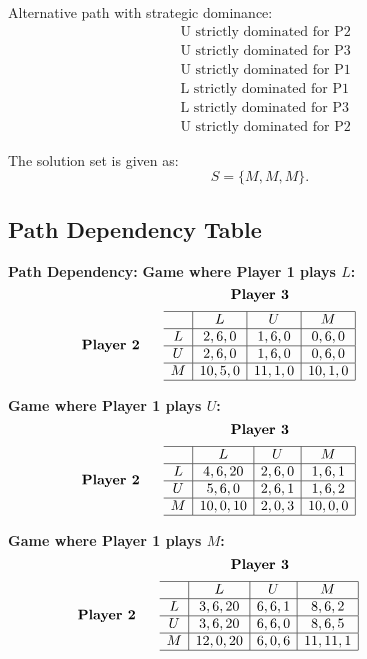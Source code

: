 \documentclass{article}
\begin{document}
Alternative path with strategic dominance:
\begin{align*}
& \text{U strictly dominated for P2} \\
& \text{U strictly dominated for P3} \\
& \text{U strictly dominated for P1} \\
& \text{L strictly dominated for P1} \\
& \text{L strictly dominated for P3} \\
& \text{U strictly dominated for P2}
\end{align*}



The solution set is given as:
\[
S = \{M, M, M\}.
\]

\subsection*{Path Dependency Table}

\textbf{Path Dependency:} %
\noindent \textbf{Game where Player 1 plays $L$:}
\[
\text{\textbf{Player 3}}
\]
\[
\makebox[0pt][r]{\text{\textbf{Player 2 }} \quad}
\begin{array}{c|c|c|c|}
\hline
& L & U & M \\
\hline
L & 2,6,0 & 1,6,0 & 0,6,0  \\
\hline
U & 2,6,0 & 1,6,0 & 0,6,0 \\
\hline
M & 10,5,0 & 11,1,0 & 10,1,0  \\
\hline
\end{array}
\]

\noindent \textbf{Game where Player 1 plays $U$:}
\[
\text{\textbf{Player 3}}
\]
\[
\makebox[0pt][r]{\text{\textbf{Player 2 }} \quad}
\begin{array}{c|c|c|c|}
\hline
& L & U & M \\
\hline
L & 4,6,20 & 2,6,0 & 1,6,1  \\
\hline
U & 5,6,0 & 2,6,1 & 1,6,2 \\
\hline
M & 10,0,10 & 2,0,3 & 10,0,0  \\
\hline
\end{array}
\]

\noindent \textbf{Game where Player 1 plays $M$:}
\[
\text{\textbf{Player 3}}
\]
\[
\makebox[0pt][r]{\text{\textbf{Player 2 }} \quad}
\begin{array}{c|c|c|c|}
\hline
& L & U & M \\
\hline
L & 3,6,20 & 6,6,1 & 8,6,2  \\
\hline
U & 3,6,20 & 6,6,0 & 8,6,5 \\
\hline
M & 12,0,20 & 6,0,6 & 11,11,1  \\
\hline
\end{array}
\]
\end{document}
